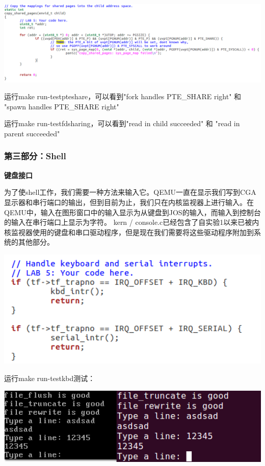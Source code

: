 \begin{ExerciseList}
  \includegraphics[width=6in]{figures/lab5/image91.png}

  运行make run-testpteshare，可以看到"fork handles PTE\_SHARE right" 和 "spawn handles PTE\_SHARE right"

  运行make run-testfdsharing，可以看到"read in child succeeded" 和 "read in parent succeeded"

  \subsubsection{第三部分：Shell}

  \textbf{键盘接口}

  为了使shell工作，我们需要一种方法来输入它。QEMU一直在显示我们写到CGA显示器和串行端口的输出，但到目前为止，我们只在内核监视器上进行输入。在QEMU中，输入在图形窗口中的输入显示为从键盘到JOS的输入，而输入到控制台的输入在串行端口上显示为字符。 kern / console.c已经包含了自实验1以来已被内核监视器使用的键盘和串口驱动程序，但是现在我们需要将这些驱动程序附加到系统的其他部分。


  \includegraphics[width=6in]{figures/lab5/image96.png}

  运行make run-testkbd测试：

  \includegraphics[width=6in]{figures/lab5/image97.png}


\end{ExerciseList}
